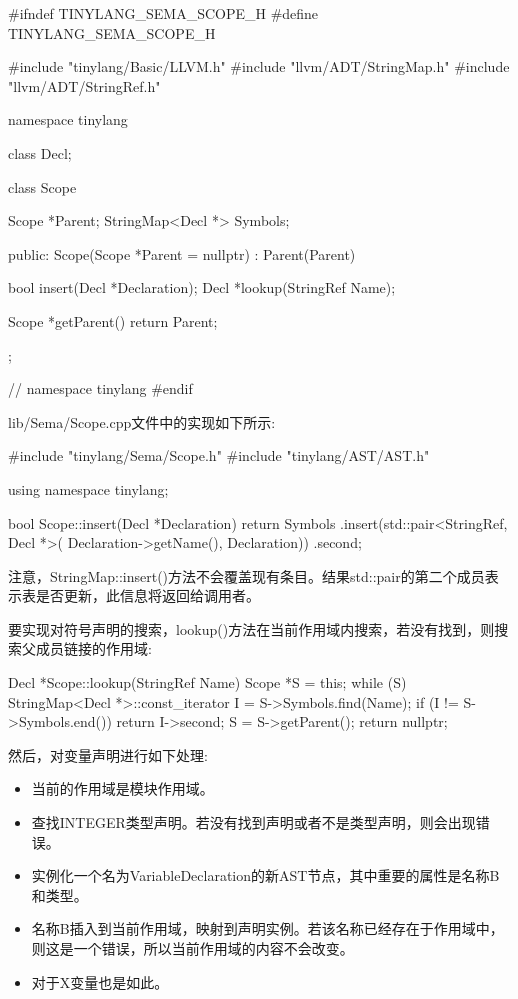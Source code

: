 \begin{cpp}
#ifndef TINYLANG_SEMA_SCOPE_H
#define TINYLANG_SEMA_SCOPE_H

#include "tinylang/Basic/LLVM.h"
#include "llvm/ADT/StringMap.h"
#include "llvm/ADT/StringRef.h"

namespace tinylang {

class Decl;

class Scope {
    Scope *Parent;
    StringMap<Decl *> Symbols;

    public:
    Scope(Scope *Parent = nullptr) : Parent(Parent) {}

    bool insert(Decl *Declaration);
    Decl *lookup(StringRef Name);

    Scope *getParent() { return Parent; }
};
} // namespace tinylang
#endif
\end{cpp}

lib/Sema/Scope.cpp文件中的实现如下所示:

\begin{cpp}
#include "tinylang/Sema/Scope.h"
#include "tinylang/AST/AST.h"

using namespace tinylang;

bool Scope::insert(Decl *Declaration) {
    return Symbols
        .insert(std::pair<StringRef, Decl *>(
            Declaration->getName(), Declaration))
        .second;
}
\end{cpp}

注意，StringMap::insert()方法不会覆盖现有条目。结果std::pair的第二个成员表示表是否更新，此信息将返回给调用者。

要实现对符号声明的搜索，lookup()方法在当前作用域内搜索，若没有找到，则搜索父成员链接的作用域:

\begin{cpp}
Decl *Scope::lookup(StringRef Name) {
    Scope *S = this;
    while (S) {
        StringMap<Decl *>::const_iterator I =
            S->Symbols.find(Name);
        if (I != S->Symbols.end())
            return I->second;
        S = S->getParent();
    }
    return nullptr;
}
\end{cpp}

然后，对变量声明进行如下处理:

\begin{itemize}
\item
当前的作用域是模块作用域。

\item
查找INTEGER类型声明。若没有找到声明或者不是类型声明，则会出现错误。

\item
实例化一个名为VariableDeclaration的新AST节点，其中重要的属性是名称B和类型。

\item
名称B插入到当前作用域，映射到声明实例。若该名称已经存在于作用域中，则这是一个错误，所以当前作用域的内容不会改变。

\item
对于X变量也是如此。
\end{itemize}

